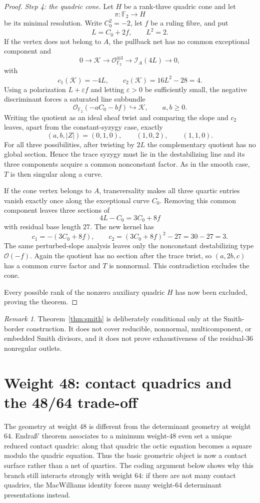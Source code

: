 \documentclass[11pt,reqno]{amsart}
\theoremstyle{remark}
\newtheorem{remark}[theorem]{Remark}
\newcommand{\cO}{\mathcal O}
\newcommand{\cI}{\mathcal I}
\begin{document}
\begin{proof}
\emph{Step 4: the quadric cone.}
Let $H$ be a rank-three quadric cone and let
\[
\pi:\mathbb F_2\to H
\]
be its minimal resolution.  Write $C_0^2=-2$, let $f$ be a ruling fibre, and put
\[
L=C_0+2f,
\qquad L^2=2.
\]
If the vertex does not belong to $A$, the pullback net has no common exceptional component and
\[
0\to\mathcal K\to\cO_{\mathbb F_2}^{\oplus3}
\to\cI_A(4L)\to0,
\]
with
\[
c_1(\mathcal K)=-4L,
\qquad c_2(\mathcal K)=16L^2-28=4.
\]
Using a polarization $L+\varepsilon f$ and letting $\varepsilon>0$ be sufficiently small, the negative discriminant forces a saturated line subbundle
\[
\cO_{\mathbb F_2}(-aC_0-bf)\hookrightarrow\mathcal K,
\qquad a,b\ge0.
\]
Writing the quotient as an ideal sheaf twist and comparing the slope and $c_2$ leaves, apart from the constant-syzygy case, exactly
\[
(a,b,|Z|)=(0,1,0),\qquad(1,0,2),\qquad(1,1,0).
\]
For all three possibilities, after twisting by $2L$ the complementary quotient has no global section.  Hence the trace syzygy must lie in the destabilizing line and its three components acquire a common nonconstant factor.  As in the smooth case, $T$ is then singular along a curve.

If the cone vertex belongs to $A$, transversality makes all three quartic entries vanish exactly once along the exceptional curve $C_0$.  Removing this common component leaves three sections of
\[
4L-C_0=3C_0+8f
\]
with residual base length $27$.  The new kernel has
\[
c_1=-(3C_0+8f),
\qquad
c_2=(3C_0+8f)^2-27=30-27=3.
\]
The same perturbed-slope analysis leaves only the nonconstant destabilizing type $\cO(-f)$.  Again the quotient has no section after the trace twist, so $(a,2b,c)$ has a common curve factor and $T$ is nonnormal.  This contradiction excludes the cone.

Every possible rank of the nonzero auxiliary quadric $H$ has now been excluded, proving the theorem.
\end{proof}

\begin{remark}
Theorem~\ref{thm:smith} is deliberately conditional only at the Smith-border construction.  It does not cover reducible, nonnormal, multicomponent, or embedded Smith divisors, and it does not prove exhaustiveness of the residual-$36$ nonregular outlets.
\end{remark}

\fi

\section{Weight 48: contact quadrics and the 48/64 trade-off}\label{sec:w48}
The geometry at weight $48$ is different from the determinant geometry at weight $64$.  Endra\ss' theorem associates to a minimum weight-$48$ even set a unique reduced contact quadric: along that quadric the octic equation becomes a square modulo the quadric equation.  Thus the basic geometric object is now a contact surface rather than a net of quartics.  The coding argument below shows why this branch still interacts strongly with weight $64$: if there are not many contact quadrics, the MacWilliams identity forces many weight-$64$ determinant presentations instead.
\end{document}
